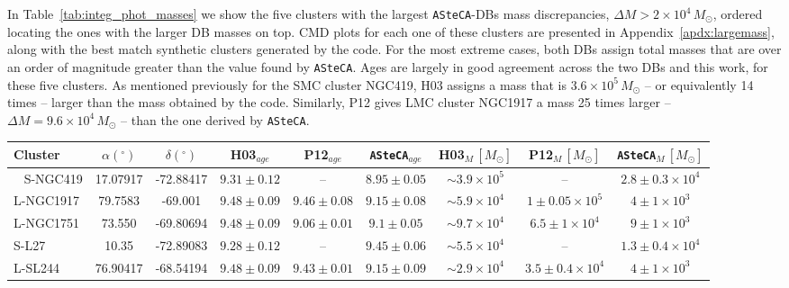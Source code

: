 \documentclass{aa}
\begin{document}
%
In Table~\ref{tab:integ_phot_masses} we show the five clusters with the largest
\texttt{ASteCA}-DBs mass discrepancies, $\Delta M{>}2{\times}10^4\,M_{\odot}$,
ordered locating the ones with the larger DB masses on top.
CMD plots for each one of these clusters are presented in
Appendix~\ref{apdx:largemass}, along with the best match synthetic clusters
generated by the code.
For the most extreme cases, both DBs assign total masses that are over an order
of magnitude greater than the value found by \texttt{ASteCA}.
Ages are largely in good agreement across the two DBs and this work, for these
five clusters.
As mentioned previously for the SMC cluster NGC419, H03 assigns a mass that is
$3.6{\times}10^5\,M_{\odot}$ -- or equivalently 14 times -- larger than the mass
obtained by the code. Similarly, P12 gives LMC cluster NGC1917 a mass 25
times larger -- $\Delta M{=}9.6{\times}10^4\,M_{\odot}$ -- than the one
derived by \texttt{ASteCA}.

%
\begin{table*}
\centering
\caption{Clusters with large differences ($\Delta M{>}20000\,M_{\odot}$) in
their assigned \texttt{ASteCA} masses, versus the values found in the DBs.
Equatorial coordinates are expressed in degrees for the $J2000.0$ epoch.
Ages are given as $\log(age/yr)$.}
\label{tab:integ_phot_masses}
\begin{tabular}{lcccccccc}
\hline\hline
Cluster & $\alpha(^\circ)$ & $\delta(^\circ)$ & H03$_{age}$ &
P12$_{age}$ & \texttt{ASteCA}$_{age}$ &
H03$_{M}\,[M_{\odot}]$ &
P12$_{M}\,[M_{\odot}]$ & \texttt{ASteCA}$_{M}\,[M_{\odot}]$\\
\hline\
%
S-NGC419 & 17.07917 & -72.88417 & $9.31{\pm}0.12$ & -- & $8.95{\pm}0.05$ &
$\sim3.9{\times}10^{5}$ & -- & $2.8{\pm}0.3{\times}10^{4}$\\
%
L-NGC1917 & 79.7583 & -69.001 & $9.48{\pm}0.09$ & $9.46{\pm}0.08$ & $9.15{\pm}0.08$ &
$\sim5.9{\times}10^{4}$ & $1{\pm}0.05{\times}10^{5}$ & $4{\pm}1{\times}10^{3}$\\
%
L-NGC1751 & 73.550 & -69.80694 & $9.48{\pm}0.09$ & $9.06{\pm}0.01$ & $9.1{\pm}0.05$ &
$\sim9.7{\times}10^{4}$ & $6.5{\pm}1{\times}10^{4}$ & $9{\pm}1{\times}10^{3}$\\
%
S-L27 & 10.35 & -72.89083 & $9.28{\pm}0.12$ & -- & $9.45{\pm}0.06$ &
$\sim5.5{\times}10^{4}$ & -- & $1.3{\pm}0.4{\times}10^{4}$\\
%
L-SL244 & 76.90417 & -68.54194 & $9.48{\pm}0.09$ & $9.43{\pm}0.01$ & $9.15{\pm}0.09$ &
$\sim2.9{\times}10^{4}$ & $3.5{\pm}0.4{\times}10^{4}$ & $4{\pm}1{\times}10^{3}$\\
\hline   
\end{tabular}
\end{table*}
\end{document}

